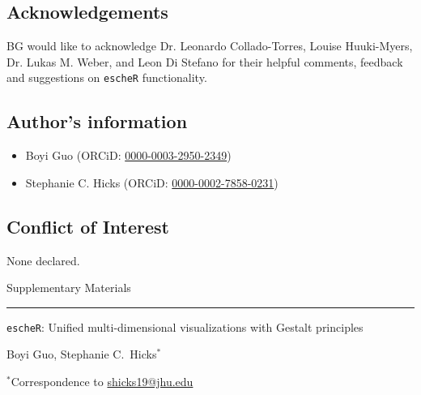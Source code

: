\documentclass[10pt,twocolumn]{article}
\begin{document}
\subsection*{Acknowledgements}
BG would like to acknowledge Dr. Leonardo Collado-Torres, Louise Huuki-Myers, Dr. Lukas M. Weber, and Leon Di Stefano for their helpful comments, feedback and suggestions on \texttt{escheR} functionality.



\subsection*{Author’s information}

\begin{itemize}[nosep]
    \item Boyi Guo (ORCiD: \href{https://orcid.org/0000-0003-2950-2349}{0000-0003-2950-2349})
    \item Stephanie C. Hicks (ORCiD: \href{https://orcid.org/0000-0002-7858-0231}{0000-0002-7858-0231})
\end{itemize} 

\subsection*{Conflict of Interest} 
None declared.



\clearpage 



\clearpage
\onecolumn

{\huge Supplementary Materials}

\hrule

\vspace*{0.5cm}

\begin{center}

{\Large \texttt{escheR}: Unified multi-dimensional visualizations with Gestalt principles}

\vspace*{0.75cm}

{\large Boyi Guo, Stephanie C.\ Hicks$^*$}

\vspace*{0.3cm}

{\small $^*$Correspondence to \url{shicks19@jhu.edu}}

\end{center}

\renewcommand{\figurename}{Supplementary Figure}
\renewcommand{\tablename}{Supplementary Table}
\setcounter{figure}{0}
\setcounter{table}{0}
\setcounter{section}{0}
\setcounter{page}{1}
\makeatletter
\renewcommand{\thefigure}{S\@arabic\c@figure}
\renewcommand{\thetable}{S\@arabic\c@table}
\renewcommand{\thesection}{Supplemental Note S\@arabic\c@section}
\makeatother
\end{document}
